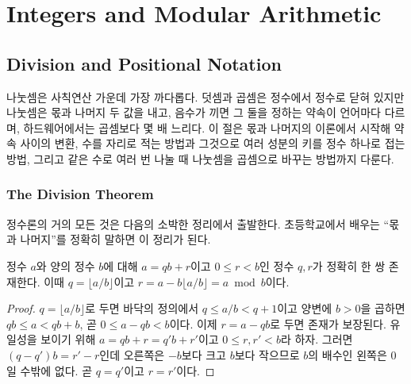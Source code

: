 \chapter{Integers and Modular Arithmetic}
\label{ch:integers}



\section{Division and Positional Notation}
\label{sec:division}

나눗셈은 사칙연산 가운데 가장 까다롭다. 덧셈과 곱셈은 정수에서 정수로 닫혀 있지만 나눗셈은 몫과 나머지 두 값을 내고, 음수가 끼면 그 둘을 정하는 약속이 언어마다 다르며, 하드웨어에서는 곱셈보다 몇 배 느리다. 이 절은 몫과 나머지의 이론에서 시작해 약속 사이의 변환, 수를 자리로 적는 방법과 그것으로 여러 성분의 키를 정수 하나로 접는 방법, 그리고 같은 수로 여러 번 나눌 때 나눗셈을 곱셈으로 바꾸는 방법까지 다룬다.

\subsection{The Division Theorem}

정수론의 거의 모든 것은 다음의 소박한 정리에서 출발한다. 초등학교에서 배우는 ``몫과 나머지''를 정확히 말하면 이 정리가 된다.

\begin{theorem}[나눗셈 정리]
\label{thm:division}
정수 $a$와 양의 정수 $b$에 대해 $a=qb+r$이고 $0\le r<b$인 정수 $q,r$가 정확히 한 쌍 존재한다. 이때 $q=\lfloor a/b\rfloor$이고 $r=a-b\lfloor a/b\rfloor=a\bmod b$이다.
\end{theorem}

\begin{proof}
$q=\lfloor a/b\rfloor$로 두면 바닥의 정의에서 $q\le a/b<q+1$이고 양변에 $b>0$을 곱하면 $qb\le a<qb+b$, 곧 $0\le a-qb<b$이다. 이제 $r=a-qb$로 두면 존재가 보장된다. 유일성을 보이기 위해 $a=qb+r=q'b+r'$이고 $0\le r,r'<b$라 하자. 그러면 $(q-q')b=r'-r$인데 오른쪽은 $-b$보다 크고 $b$보다 작으므로 $b$의 배수인 왼쪽은 $0$일 수밖에 없다. 곧 $q=q'$이고 $r=r'$이다.
\end{proof}

